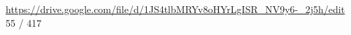 \vspace{4cm}
\url{https://drive.google.com/file/d/1JS4tlbMRYv8oHYrLgISR_NV9y6-_2j5h/edit}\\
55 / 417


















































































































